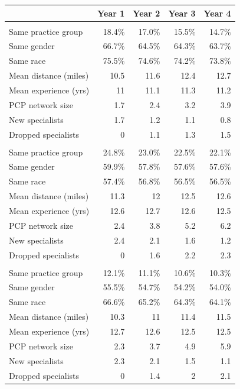 \begin{tabular}{lrrrr}
\toprule
  & Year 1 & Year 2 & Year 3 & Year 4\\
\midrule
\addlinespace[0.5em]
\multicolumn{5}{l}{\textbf{Orthopedic Surgery}}\\
Same practice group & 18.4\% & 17.0\% & 15.5\% & 14.7\%\\
Same gender & 66.7\% & 64.5\% & 64.3\% & 63.7\%\\
Same race & 75.5\% & 74.6\% & 74.2\% & 73.8\%\\
Mean distance (miles) & 10.5 & 11.6 & 12.4 & 12.7\\
Mean experience (yrs) & 11 & 11.1 & 11.3 & 11.2\\
PCP network size & 1.7 & 2.4 & 3.2 & 3.9\\
New specialists & 1.7 & 1.2 & 1.1 & 0.8\\
Dropped specialists & 0 & 1.1 & 1.3 & 1.5\\
\addlinespace[0.5em]
\multicolumn{5}{l}{\textbf{Cardiology}}\\
Same practice group & 24.8\% & 23.0\% & 22.5\% & 22.1\%\\
Same gender & 59.9\% & 57.8\% & 57.6\% & 57.6\%\\
Same race & 57.4\% & 56.8\% & 56.5\% & 56.5\%\\
Mean distance (miles) & 11.3 & 12 & 12.5 & 12.6\\
Mean experience (yrs) & 12.6 & 12.7 & 12.6 & 12.5\\
PCP network size & 2.4 & 3.8 & 5.2 & 6.2\\
New specialists & 2.4 & 2.1 & 1.6 & 1.2\\
Dropped specialists & 0 & 1.6 & 2.2 & 2.3\\
\addlinespace[0.5em]
\multicolumn{5}{l}{\textbf{Dermatology}}\\
Same practice group & 12.1\% & 11.1\% & 10.6\% & 10.3\%\\
Same gender & 55.5\% & 54.7\% & 54.2\% & 54.0\%\\
Same race & 66.6\% & 65.2\% & 64.3\% & 64.1\%\\
Mean distance (miles) & 10.3 & 11 & 11.4 & 11.5\\
Mean experience (yrs) & 12.7 & 12.6 & 12.5 & 12.5\\
PCP network size & 2.3 & 3.7 & 4.9 & 5.9\\
New specialists & 2.3 & 2.1 & 1.5 & 1.1\\
Dropped specialists & 0 & 1.4 & 2 & 2.1\\
\bottomrule
\end{tabular}
